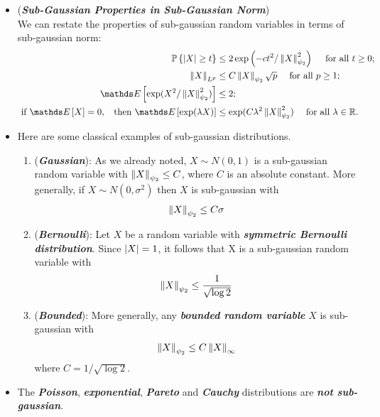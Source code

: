 \documentclass[11pt]{article}
\begin{document}
\begin{itemize}
\item \begin{remark} (\emph{\textbf{Sub-Gaussian  Properties in Sub-Gaussian Norm}})\\
We can restate the properties of sub-gaussian random variables in terms of sub-gaussian norm:
\begin{align*}
\bP\set{\abs{X} \ge t} &\le 2 \exp\paren{-c t^2/\norm{X}{\psi_2}^2}\quad\text{ for all }t \ge 0; \\
\norm{X}{L^p} &\le C \norm{X}{\psi_2} \sqrt{p}\quad \text{ for all }p \ge 1; \\
\E{}{\exp(X^2 / \norm{X}{\psi_2}^2)} &\le 2; \\
\text{ if }\E{}{X} = 0, \;\;\text{ then } \E{}{\exp(\lambda X)} &\le  \exp(C \lambda^2 \norm{X}{\psi_2}^2)\quad\text{ for all }\lambda \in \bR.
\end{align*}
\end{remark}

\item \begin{example}
Here are some classical examples of sub-gaussian distributions.
\begin{enumerate}
\item  (\textbf{\emph{Gaussian}}): As we already noted, $X \sim N(0, 1)$ is a sub-gaussian random
variable with $\left\|X\right\|_{\psi_2} \le C$, where $C$ is an absolute constant. More generally, if $X \sim N(0, \sigma^2)$ then $X$ is sub-gaussian with
\begin{align}
\left\|X\right\|_{\psi_2} \le C\sigma \label{eqn: gaussian_sub_guassian_norm}
\end{align}
\item  (\emph{\textbf{Bernoulli}}): Let $X$ be a random variable with \emph{\textbf{symmetric Bernoulli distribution}}. Since $\left\lvert X \right\rvert = 1$, it follows that X is a
sub-gaussian random variable with
\begin{align}
\left\|X\right\|_{\psi_2} \le \frac{1}{\sqrt{\log 2}} \label{eqn: sym_bernoulli_sub_guassian_norm}
\end{align}
\item (\emph{\textbf{Bounded}}): More generally, any \emph{\textbf{bounded random variable}} $X$ is sub-gaussian with
\begin{align}
\left\|X\right\|_{\psi_2} \le C\left\|X\right\|_{\infty} \label{eqn: bounded_sub_guassian_norm}
\end{align}
where $C = 1/\sqrt{\log 2}$.
\end{enumerate}
\end{example}

\item \begin{example}
The \emph{\textbf{Poisson}}, \emph{\textbf{exponential}}, \emph{\textbf{Pareto}} and \emph{\textbf{Cauchy}} distributions are \emph{\textbf{not sub-gaussian}}.
\end{example}
\end{itemize}
\end{document}
